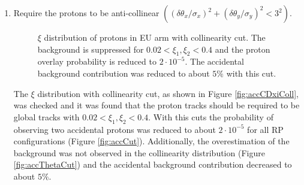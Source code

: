 \begin{enumerate}
	\item Require the protons to be anti-collinear $\left(\left(\delta\theta_x/\sigma_x\right)^2+\left(\delta\theta_y/\sigma_y\right)^2<3^2\right)$. 
\begin{figure}[H]
	\centering
	\parbox{0.48\textwidth}{
		\centering
		\begin{subfigure}[b]{\linewidth}{
				}
		\end{subfigure}
	}
	\quad
	\parbox{0.48\textwidth}{
		\centering
		\begin{subfigure}[b]{\linewidth}{
				}
		\end{subfigure}
	}
	\parbox{0.48\textwidth}{
		\centering
		\begin{subfigure}[b]{\linewidth}{
				}
		\end{subfigure}
	}
	\caption[x]{$\xi$ distribution of protons in EU arm with collinearity cut. The background is suppressed for  $0.02<\xi_1,\xi_2<0.4$ and the proton overlay probability is reduced to $2\cdot10^{-5}$. The accidental background contribution was reduced to about $5\%$ with this cut.}
\end{figure}
	The $\xi$ distribution  with collinearity cut, as shown in Figure \ref{fig:accCDxiColl}, was checked and it was found that the proton tracks should be required to be global tracks with $0.02<\xi_1,\xi_2<0.4$. With this cuts the probability of observing two accidental protons was reduced to about $2\cdot10^{-5}$ for all RP configurations (Figure \ref{fig:accCut}). Additionally, the overestimation of the background was not observed in the collinearity distribution (Figure \ref{fig:accThetaCut}) and the accidental background contribution decreased to about $5\%$.
\begin{figure}[H]
	\centering
	\parbox{0.48\textwidth}{
		\centering
		\begin{subfigure}[b]{\linewidth}{
				}
		\end{subfigure}
	}
	\quad
	\parbox{0.48\textwidth}{
		\centering
		\begin{subfigure}[b]{\linewidth}{
				}

\end{subfigure}}
\end{figure}
\end{enumerate}
